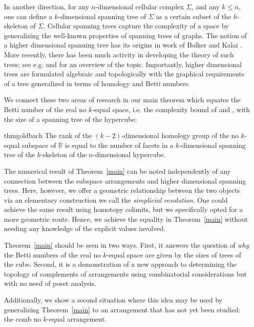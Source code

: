\documentclass{amsart}
\newcommand{\R}{{\mathbb R}}
\begin{document}
In another direction, for any $n$-dimensional cellular complex
$\Sigma$, and any $k \leq n$,  one can define a $k$-dimensional spanning
tree of $\Sigma$ as a certain subset of the $k$-skeleton of $\Sigma$. 
Cellular spanning trees capture the complexity of a space by generalizing
the well-known properties of spanning trees of graphs.  
 The notion of a higher dimensional spanning tree has its
origins in work of Bolker \cite{Bolk} and Kalai \cite{Kalai}.  More
recently, there has been much activity in developing the theory of
such trees; see e.g. \cite{DKM09, Lyons} and \cite{chapter} for an
overview of the topic.  Importantly, higher dimensional trees are
formulated algebraic and topologically with the graphical
requirements of a tree generalized in terms of homology and Betti numbers.

We connect these two areas of research in our main theorem which
equates the Betti number of the real no $k$-equal space, i.e. the complexity
bound of \cite{BLY} and \cite{BW}, with the size of a spanning tree of
the hypercube:



\begin{restatable}{thm}{goldbach}
  \label{main}
The rank of the $(k-2)$-dimensional homology group of the no $k$-equal subspace of $\R$ is equal to 
the number of facets in a $k$-dimensional spanning tree of the $k$-skeleton of the $n$-dimensional hypercube.
\end{restatable}



The numerical result of Theorem~\ref{main} can be noted independently
of any connection between the subspace arrangements and higher
dimensional spanning trees. Here, however, we offer a geometric
relationship between the two objects via an elementary construction we
call the {\em simplicial resolution}.  One could achieve the same
result using  homotopy colimits, but we specifically opted for a
more geometric route.  Hence,  we achieve the equality in
Theorem~\ref{main} without needing any knowledge of the explicit
values involved.

Theorem~\ref{main} should be seen in two ways.  First, it answers the
question of \emph{why} the Betti numbers of the real no $k$-equal
space are given by the sizes of trees of the cube.  Second, it is a
demonstration of a new approach to determining the topology of
complements of arrangements using combinatorial considerations but with no
need of poset analysis.

Additionally, we show a second situation where this idea may be used by
generalizing Theorem~\ref{main} to an arrangement that has not yet been
studied: the comb no $k$-equal arrangement.
\end{document}
